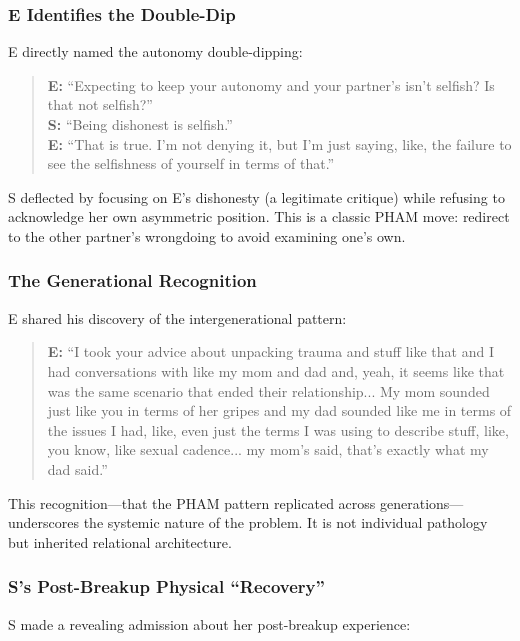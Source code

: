\documentclass[12pt, letterpaper]{article}
\begin{document}
\subsubsection{E Identifies the Double-Dip}

E directly named the autonomy double-dipping:

\begin{quote}
\textbf{E:} ``Expecting to keep your autonomy and your partner's isn't selfish? Is that not selfish?''\\[0.5em]
\textbf{S:} ``Being dishonest is selfish.''\\[0.5em]
\textbf{E:} ``That is true. I'm not denying it, but I'm just saying, like, the failure to see the selfishness of yourself in terms of that.''
\end{quote}

S deflected by focusing on E's dishonesty (a legitimate critique) while refusing to acknowledge her own asymmetric position. This is a classic PHAM move: redirect to the other partner's wrongdoing to avoid examining one's own.

\subsubsection{The Generational Recognition}

E shared his discovery of the intergenerational pattern:

\begin{quote}
\textbf{E:} ``I took your advice about unpacking trauma and stuff like that and I had conversations with like my mom and dad and, yeah, it seems like that was the same scenario that ended their relationship... My mom sounded just like you in terms of her gripes and my dad sounded like me in terms of the issues I had, like, even just the terms I was using to describe stuff, like, you know, like sexual cadence... my mom's said, that's exactly what my dad said.''
\end{quote}

This recognition---that the PHAM pattern replicated across generations---underscores the systemic nature of the problem. It is not individual pathology but inherited relational architecture.

\subsubsection{S's Post-Breakup Physical ``Recovery''}

S made a revealing admission about her post-breakup experience:
\end{document}

